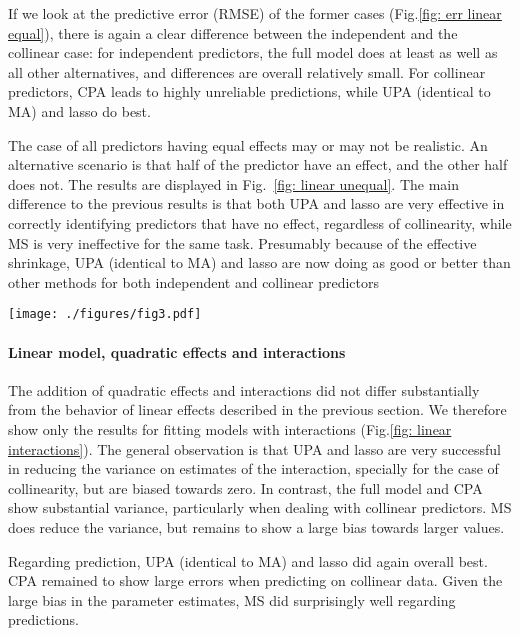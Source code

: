 \documentclass[5p]{elsarticle}
\begin{document}
If we look at the predictive error (RMSE) of the former cases (Fig.\ref{fig: err linear equal}), there is again a clear difference between the independent and the collinear case: for independent predictors, the full model does at least as well as all other alternatives, and differences are overall relatively small. For collinear predictors, CPA leads to highly unreliable predictions, while UPA (identical to MA) and lasso do best. 


The case of all predictors having equal effects may or may not be realistic. An alternative scenario is that half of the predictor have an effect, and the other half does not. The results are displayed in Fig.~\ref{fig: linear unequal}. The main difference to the previous results is that both UPA and lasso are very effective in correctly identifying predictors that have no effect, regardless of collinearity, while MS is very ineffective for the same task. Presumably because of the effective shrinkage, UPA (identical to MA) and lasso are now doing as good or better than other methods for both independent and collinear predictors 


\begin{figure*}\label{fig: linear unequal}
\texttt{[image: ./figures/fig3.pdf]}
\caption{Bias and predictive error of parameter estimates for linear regressions with independent (left) and collinear predictors.}
\end{figure*}


\paragraph{Linear model, quadratic effects and interactions} 

The addition of quadratic effects and interactions did not differ substantially from the behavior of linear effects described in the previous section. We therefore show only the results for fitting models with interactions (Fig.\ref{fig: linear interactions}). The general observation is that UPA and lasso are very successful in reducing the variance on estimates of the interaction, specially for the case of collinearity, but are biased towards zero. In contrast, the full model and CPA show substantial variance, particularly when dealing with collinear predictors. MS does reduce the variance, but remains to show a large bias towards larger values. 

Regarding prediction, UPA (identical to MA) and lasso did again overall best. CPA remained to show large errors when predicting on collinear data. Given the large bias in the parameter estimates, MS did surprisingly well regarding predictions.  
\end{document}
